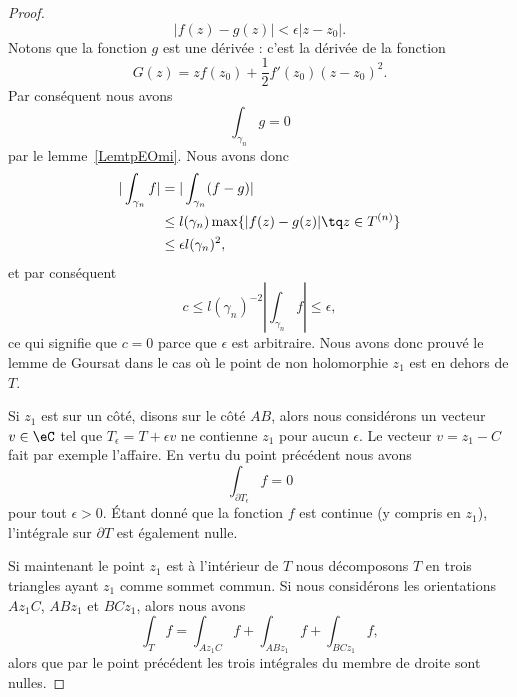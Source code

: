 \begin{proof}
	\begin{equation}
		| f(z)-g(z) |<\epsilon| z-z_0 |.
	\end{equation}
	Notons que la fonction \( g\) est une dérivée : c'est la dérivée de la fonction
	\begin{equation}
		G(z)=zf(z_0)+\frac{ 1 }{2}f'(z_0)(z-z_0)^2.
	\end{equation}
	Par conséquent nous avons
	\begin{equation}
		\int_{\gamma_n}g=0
	\end{equation}
	par le lemme~\ref{LemtpEOmi}. Nous avons donc
	\begin{subequations}
		\begin{align}
			| \int_{\gamma_n}f | & =|\int_{\gamma_n}(f-g)|                                 \\
			                     & \leq l(\gamma_n)\max\{ | f(z)-g(z) |\tq z\in T^{(n)} \} \\
			                     & \leq \epsilon l(\gamma_n)^2,
		\end{align}
	\end{subequations}
	et par conséquent
	\begin{equation}
		c\leq l(\gamma_n)^{-2}| \int_{\gamma_n}f |\leq \epsilon,
	\end{equation}
	ce qui signifie que \( c=0\) parce que \( \epsilon\) est arbitraire. Nous avons donc prouvé le lemme de Goursat dans le cas où le point de non holomorphie \( z_1\) est en dehors de \( T\).

	Si \( z_1\) est sur un côté, disons sur le côté \( AB\), alors nous considérons un vecteur \( v\in \eC\) tel que \( T_{\epsilon}=T+\epsilon v\) ne contienne \( z_1\) pour aucun \( \epsilon\). Le vecteur \( v=z_1-C\) fait par exemple l'affaire. En vertu du point précédent nous avons
	\begin{equation}
		\int_{\partial T_{\epsilon}}f=0
	\end{equation}
	pour tout \( \epsilon>0\). Étant donné que la fonction \( f\) est continue (y compris en \( z_1\)), l'intégrale sur \( \partial T\) est également nulle.

	Si maintenant le point \( z_1\) est à l'intérieur de \( T\) nous décomposons \( T\) en trois triangles ayant \( z_1\) comme sommet commun. Si nous considérons les orientations \( Az_1C\), \( ABz_1\) et \( BCz_1\), alors nous avons
	\begin{equation}
		\int_Tf=\int_{Az_1C}f+\int_{ABz_1}f+\int_{BCz_1}f,
	\end{equation}
	alors que par le point précédent les trois intégrales du membre de droite sont nulles.
\end{proof}

